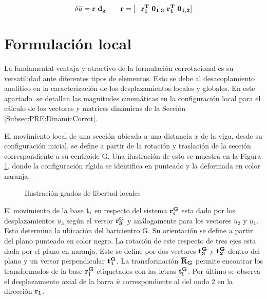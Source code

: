 \begin{equation}\label{eq:PRE:DefincionR}
\delta \overline{u} = \bf{r}~ d_g ~~~~~~\bf{r} = [ -\bf{r}_1^T~ \bf{0}_{1,3}~ \bf{r}_1^T~ \bf{0}_{1,3}  ]
\end{equation}

\section{Formulación local}\label{Sec:PRE:LocalFormul}
La fundamental ventaja y atractivo de la formulación corrotacional es su versatilidad ante diferentes tipos de elementos. Esto se debe al desacoplamiento analítico en la caracterización de los desplazamientos locales y globales. En este apartado. se detallan las magnitudes cinemáticas en la configuración local para el cálculo de los vectores y matrices dinámicas de la Sección \ref{Subsec:PRE:DinamicCorrot}. 

El movimiento local de una sección ubicada a una distancia $x$ de la viga, desde su configuración inicial, se define a partir de la rotación y traslación de la sección correspondiente a su centroide G. Una ilustración de esto se muestra en la Figura \ref{fig:PRE:IlusLocal}, donde la configuración rígida se identifica en punteado y la deformada en color naranja.

\begingroup
\begin{figure}[htbp]
	\centering
	\label{fig:PRE:IlusLocalDisp}
	\label{fig:PRE:IlusLocalAng}
	\caption{Ilustración grados de libertad locales} 	\label{fig:PRE:IlusLocal}
\end{figure}
\endgroup

El movimiento de la base $\bf{t_i}$ en respecto del sistema $\bf{r_i^G}$ esta dado por los desplazamientos  $\bar{u}_3$ según el versor  $\bf{r_3^G}$ y análogamente para los vectores $\bar{u}_2$ y $\bar{u}_1$. Esto determina la ubicación del baricientro G. Su orientación se define a partir del plano punteado en color negro. La rotación de este respecto de tres ejes esta dada por el plano en naranja. Este se define por dos vectores $\bf{t_3^G}$ y $\bf{t_2^G}$ dentro del plano y un versor perpendicular $\bf{t_1^G}$. La transformación $\bf{\overline{R}}_G$ permite encontrar  los transformados de la base $\bf{r_i^G}$ etiquetados con las letras $\bf{t_i^G}$. Por último se observa el desplazamiento axial de la barra $\bar{u}$ correspondiente al del nodo 2 en la dirección $\bf{r_1}$.

